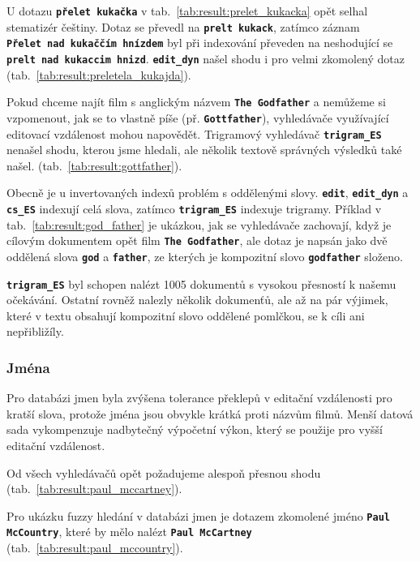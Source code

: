 \documentclass[11pt,letterpaper,oneside,openright]{book}
\newcommand{\bftt}[1]{\texttt{\textbf{#1}}}
\begin{document}
U dotazu \bftt{přelet~kukačka} v tab.~\ref{tab:result:prelet_kukacka} opět
selhal stematizér češtiny. Dotaz se převedl na \bftt{prelt~kukack}, zatímco
záznam \bftt{Přelet~nad~kukaččím~hnízdem} byl při indexování převeden na
neshodující se \bftt{prelt~nad~kukaccim~hnizd}. \bftt{edit\_dyn} našel shodu i
pro velmi zkomolený dotaz (tab.~\ref{tab:result:preletela_kukajda}).

\mbox{}\mbox{}

Pokud chceme najít film s anglickým názvem \bftt{The Godfather} a nemůžeme si
vzpomenout, jak se to vlastně píše (př. \bftt{Gottfather}), vyhledávače
využívající editovací vzdálenost mohou napovědět. Trigramový vyhledávač
\bftt{trigram\_ES} nenašel shodu, kterou jsme hledali, ale několik textově
správných výsledků také našel.  (tab.~\ref{tab:result:gottfather}).

\mbox{}\mbox{}

Obecně je u invertovaných indexů problém s oddělenými slovy. \bftt{edit},
\bftt{edit\_dyn} a \bftt{cs\_ES} indexují celá slova, zatímco
\bftt{trigram\_ES} indexuje trigramy. Příklad v
tab.~\ref{tab:result:god_father} je ukázkou, jak se vyhledávače zachovají, když
je cílovým dokumentem opět film \bftt{The Godfather}, ale dotaz je napsán jako
dvě oddělená slova \bftt{god} a \bftt{father}, ze kterých je kompozitní slovo
\bftt{godfather} složeno.

\bftt{trigram\_ES} byl schopen nalézt 1005 dokumentů s vysokou přesností k
našemu očekávání. Ostatní rovněž nalezly několik dokumenťů, ale až na pár
výjimek, které v textu obsahují kompozitní slovo oddělené pomlčkou, se k cíli
ani nepřibližíly.

\subsubsection{Jména}
Pro databázi jmen byla zvýšena tolerance překlepů v editační vzdálenosti pro
kratší slova, protože jména jsou obvykle krátká proti názvům filmů. Menší
datová sada vykompenzuje nadbytečný výpočetní výkon, který se použije pro vyšší
editační vzdálenost.

\mbox{}\mbox{}

Od všech vyhledávačů opět požadujeme alespoň přesnou shodu
(tab.~\ref{tab:result:paul_mccartney}).

\mbox{}\mbox{}

Pro ukázku fuzzy hledání v databázi jmen je dotazem zkomolené jméno
\bftt{Paul McCountry}, které by mělo nalézt \bftt{Paul McCartney}
(tab.~\ref{tab:result:paul_mccountry}).
\end{document}
